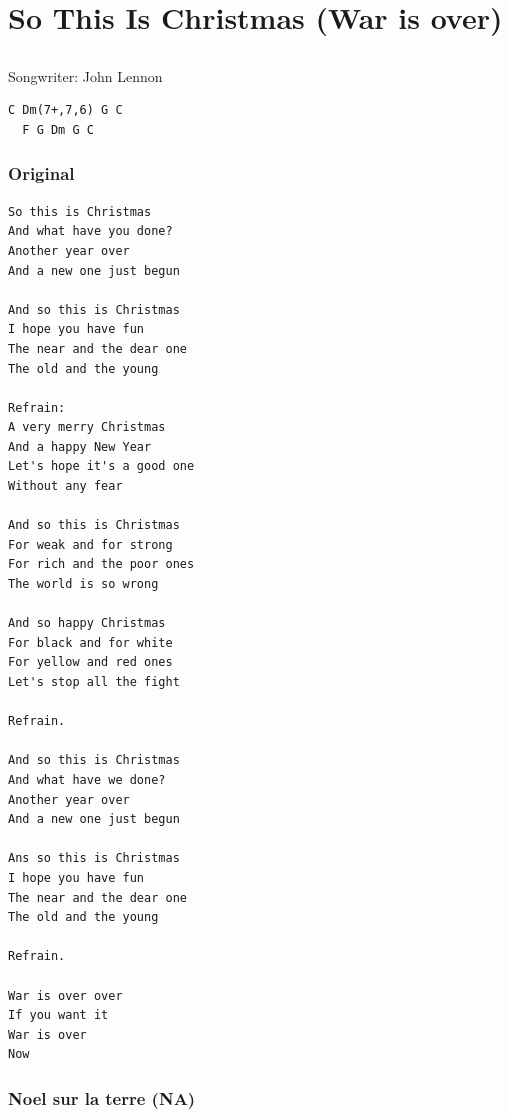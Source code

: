 \documentclass[
]{article}
\begin{document}
\hypertarget{so-this-is-christmas-war-is-over}{%
\section{So This Is Christmas (War is
over)}\label{so-this-is-christmas-war-is-over}}

\hypertarget{section-22}{%
\subsection*{}\label{section-22}}

Songwriter: John Lennon

\begin{verbatim}
C Dm(7+,7,6) G C
  F G Dm G C
\end{verbatim}

\hypertarget{original-6}{%
\subsubsection{Original}\label{original-6}}

\begin{verbatim}
So this is Christmas
And what have you done?
Another year over
And a new one just begun

And so this is Christmas
I hope you have fun
The near and the dear one
The old and the young

Refrain:
A very merry Christmas
And a happy New Year
Let's hope it's a good one
Without any fear

And so this is Christmas
For weak and for strong
For rich and the poor ones
The world is so wrong

And so happy Christmas
For black and for white
For yellow and red ones
Let's stop all the fight

Refrain.

And so this is Christmas
And what have we done?
Another year over
And a new one just begun

Ans so this is Christmas
I hope you have fun
The near and the dear one
The old and the young

Refrain.

War is over over
If you want it
War is over
Now
\end{verbatim}

\hypertarget{noel-sur-la-terre-na}{%
\subsubsection*{Noel sur la terre (NA)}\label{noel-sur-la-terre-na}}
\end{document}
